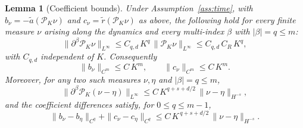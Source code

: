 \documentclass[a4paper,fleqn]{cas-sc}
\newtheorem{lemma}[theorem]{Lemma}
\theoremstyle{definition}
\theoremstyle{remark}
\begin{document}
\begin{lemma}[Coefficient bounds]\label{lem:coeff}
Under Assumption~\ref{ass:time}, with $b_\nu=-\tilde a(\mathcal P_K\nu)$ and
$c_\nu=\tilde r(\mathcal P_K\nu)$ as above, the following hold for every finite
measure $\nu$ arising along the dynamics and every multi-index $\beta$ with
$|\beta|=q\le m$:
\begin{equation}\label{equ:Bernstein_inequality}
\|\partial^\beta\mathcal P_K\nu\|_{L^\infty}
\le C_{q,d}\,K^{q}\,\|\mathcal P_K\nu\|_{L^\infty}
\le C_{q,d}\,C_R\,K^{q},
\end{equation}
with $C_{q,d}$ independent of $K$. Consequently
\begin{equation}\label{eq:Bb}
\|b_\nu\|_{C^m}\le C\,K^{m},\qquad \|c_\nu\|_{C^m}\le C\,K^{m}.
\end{equation}
Moreover, for any two such measures $\nu,\eta$ and $|\beta|=q\le m$,
\begin{equation}\label{eq:proj-diff}
\|\partial^\beta\mathcal P_K(\nu-\eta)\|_{L^\infty}
\le C\,K^{q+s+d/2}\,\|\nu-\eta\|_{H^{-s}},
\end{equation}
and the coefficient differences satisfy, for $0\le q\le m-1$,
\begin{equation}\label{eq:Blip}
\|b_\nu-b_\eta\|_{C^{q}}+\|c_\nu-c_\eta\|_{C^{q}}
\le C\,K^{\,q+s+d/2}\,\|\nu-\eta\|_{H^{-s}}.
\end{equation}
\end{lemma}
\end{document}
